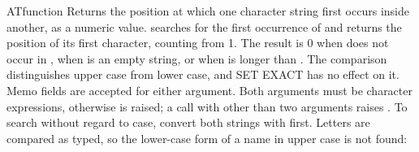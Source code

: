 \begin{XbaseEntry}{AT}{function}
Returns the position at which one character string first occurs inside another, as a numeric value.
\Syntax
{}
\Usage
{} searches  for the first occurrence of  and returns the position of its first character, counting from 1. The result is 0 when  does not occur in , when  is an empty string, or when  is longer than . The comparison distinguishes upper case from lower case, and SET EXACT has no effect on it. Memo fields are accepted for either argument. Both arguments must be character expressions, otherwise  is raised; a call with other than two arguments raises .
\Tips
To search without regard to case, convert both strings with  first.
\Examples
{}
Letters are compared as typed, so the lower-case form of a name in upper case is not found:
\end{XbaseEntry}

